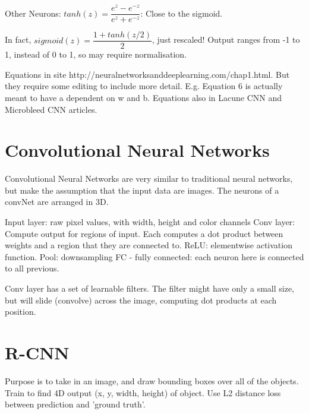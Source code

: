 \documentclass[honours,12pt]{unswthesis}
\numberwithin{equation}{section}
\begin{document}
Other Neurons:
$tanh(z) = \dfrac{e^z - e^{-z}}{e^z + e^{-z}}$: Close to the sigmoid.

In fact, $sigmoid(z) = \dfrac{1 + tanh(z/2)}{2}$, just rescaled! Output ranges from -1 to 1, instead of 0 to 1, so may require normalisation.

Equations in site http://neuralnetworksanddeeplearning.com/chap1.html. But they require some editing to include more detail. E.g. Equation 6 is actually meant to have a dependent on w and b.
Equations also in Lacune CNN and Microbleed CNN articles.

\section{Convolutional Neural Networks}\label{convNeuralNets}

Convolutional Neural Networks are very similar to traditional neural networks, but make the assumption that the input data are images.
The neurons of a convNet are arranged in 3D. 

Input layer: raw pixel values, with width, height and color channels
Conv layer: Compute output for regions of input. Each computes a dot product between weights and a region that they are connected to.
ReLU: elementwise activation function.
Pool: downsampling
FC - fully connected: each neuron here is connected to all previous.

Conv layer has a set of learnable filters. The filter might have only a small size, but will slide (convolve) across the image, computing dot products at each position.


%
%
%
%


\section{R-CNN}
Purpose is to take in an image, and draw bounding boxes over all of the objects. Train to find 4D output (x, y, width, height) of object. Use L2 distance loss between prediction and 'ground truth'.
\end{document}
